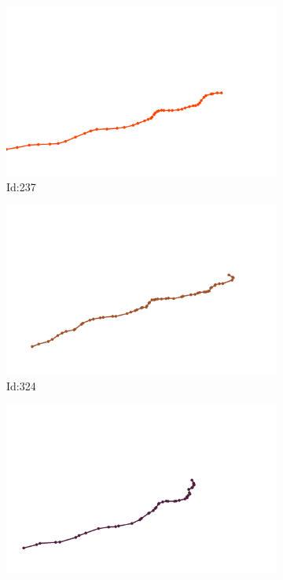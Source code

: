 \documentclass[12pt,twoside]{report}
\begin{document}
\begin{figure}
\centering
\begin{subfigure}[b]{0.20\textwidth}
\centering
\includegraphics[width=\textwidth]{../../trajectories/237.png}
\caption{Id:237}
\end{subfigure}
\begin{subfigure}[b]{0.20\textwidth}
\centering
\includegraphics[width=\textwidth]{../../trajectories/324.png}
\caption{Id:324}
\end{subfigure}
\begin{subfigure}[b]{0.20\textwidth}
\centering
\includegraphics[width=\textwidth]{../../trajectories/365.png}

\end{subfigure}
\end{figure}
\end{document}
